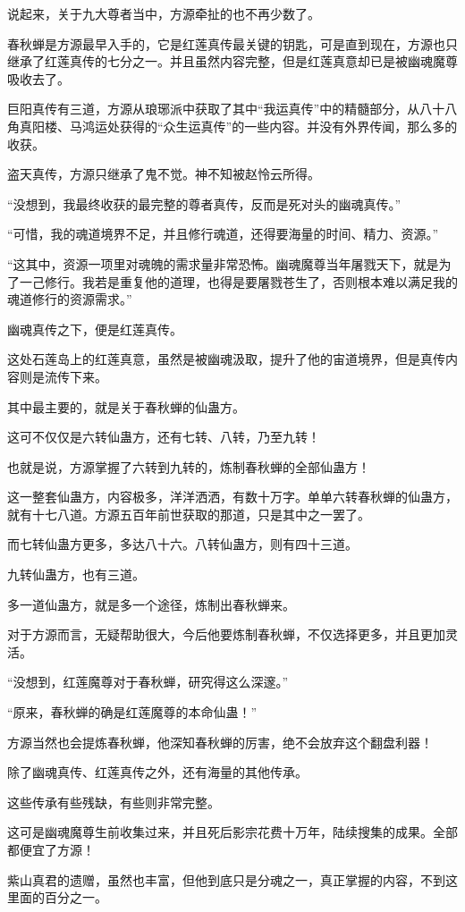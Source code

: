 \begin{this_body}
说起来，关于九大尊者当中，方源牵扯的也不再少数了。

春秋蝉是方源最早入手的，它是红莲真传最关键的钥匙，可是直到现在，方源也只继承了红莲真传的七分之一。并且虽然内容完整，但是红莲真意却已是被幽魂魔尊吸收去了。

巨阳真传有三道，方源从琅琊派中获取了其中“我运真传”中的精髓部分，从八十八角真阳楼、马鸿运处获得的“众生运真传”的一些内容。并没有外界传闻，那么多的收获。

盗天真传，方源只继承了鬼不觉。神不知被赵怜云所得。

“没想到，我最终收获的最完整的尊者真传，反而是死对头的幽魂真传。”

“可惜，我的魂道境界不足，并且修行魂道，还得要海量的时间、精力、资源。”

“这其中，资源一项里对魂魄的需求量非常恐怖。幽魂魔尊当年屠戮天下，就是为了一己修行。我若是重复他的道理，也得是要屠戮苍生了，否则根本难以满足我的魂道修行的资源需求。”

幽魂真传之下，便是红莲真传。

这处石莲岛上的红莲真意，虽然是被幽魂汲取，提升了他的宙道境界，但是真传内容则是流传下来。

其中最主要的，就是关于春秋蝉的仙蛊方。

这可不仅仅是六转仙蛊方，还有七转、八转，乃至九转！

也就是说，方源掌握了六转到九转的，炼制春秋蝉的全部仙蛊方！

这一整套仙蛊方，内容极多，洋洋洒洒，有数十万字。单单六转春秋蝉的仙蛊方，就有十七八道。方源五百年前世获取的那道，只是其中之一罢了。

而七转仙蛊方更多，多达八十六。八转仙蛊方，则有四十三道。

九转仙蛊方，也有三道。

多一道仙蛊方，就是多一个途径，炼制出春秋蝉来。

对于方源而言，无疑帮助很大，今后他要炼制春秋蝉，不仅选择更多，并且更加灵活。

“没想到，红莲魔尊对于春秋蝉，研究得这么深邃。”

“原来，春秋蝉的确是红莲魔尊的本命仙蛊！”

方源当然也会提炼春秋蝉，他深知春秋蝉的厉害，绝不会放弃这个翻盘利器！

除了幽魂真传、红莲真传之外，还有海量的其他传承。

这些传承有些残缺，有些则非常完整。

这可是幽魂魔尊生前收集过来，并且死后影宗花费十万年，陆续搜集的成果。全部都便宜了方源！

紫山真君的遗赠，虽然也丰富，但他到底只是分魂之一，真正掌握的内容，不到这里面的百分之一。


\end{this_body}
